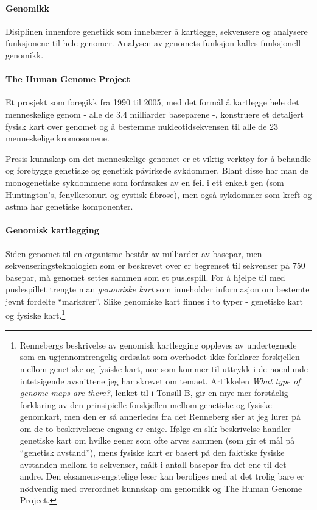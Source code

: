 \paragraph{Genomikk} Disiplinen innenfore genetikk som innebærer å kartlegge, sekvensere og analysere funksjonene til hele genomer. Analysen av genomets funksjon kalles funksjonell genomikk.

\paragraph{The Human Genome Project} Et prosjekt som foregikk fra 1990 til 2005, med det formål å kartlegge hele det menneskelige genom - alle de 3.4 milliarder baseparene -, konstruere et detaljert fysisk kart over genomet og å bestemme nukleotidsekvensen til alle de 23 menneskelige kromosomene.

Presis kunnskap om det menneskelige genomet er et viktig verktøy for å behandle og forebygge genetiske og genetisk påvirkede sykdommer. Blant disse har man de monogenetiske sykdommene som forårsakes av en feil i ett enkelt gen (som Huntington's, fenylketonuri og cystisk fibrose), men også sykdommer som kreft og astma har genetiske komponenter. 

\paragraph{Genomisk kartlegging} Siden genomet til en organisme består av milliarder av basepar, men sekvenseringsteknologien som er beskrevet over er begrenset til sekvenser på 750 basepar, må genomet settes sammen som et puslespill. For å hjelpe til med puslespillet trengte man \emph{genomiske kart} som inneholder informasjon om bestemte jevnt fordelte ``markører''. Slike genomiske kart finnes i to typer - genetiske kart og fysiske kart.\footnote{Rennebergs beskrivelse av genomisk kartlegging oppleves av undertegnede som en ugjennomtrengelig ordsalat som overhodet ikke forklarer forskjellen mellom genetiske og fysiske kart, noe som kommer til uttrykk i de noenlunde intetsigende avsnittene jeg har skrevet om temaet. Artikkelen \emph{What type of genome maps are there?}, lenket til i Tonsill B, gir en mye mer forståelig forklaring av den prinsipielle forskjellen mellom genetiske og fysiske genomkart, men den er så annerledes fra det Renneberg sier at jeg lurer på om de to beskrivelsene engang er enige. Ifølge en slik beskrivelse handler genetiske kart om hvilke gener som ofte arves sammen (som gir et mål på ``genetisk avstand''), mens fysiske kart er basert på den faktiske fysiske avstanden mellom to sekvenser, målt i antall basepar fra det ene til det andre. Den eksamens-engstelige leser kan beroliges med at det trolig bare er nødvendig med overordnet kunnskap om genomikk og The Human Genome Project.}

